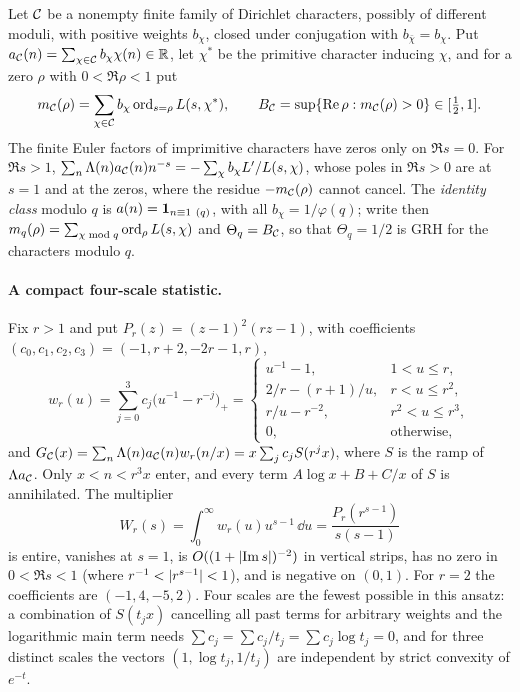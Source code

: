 Let $\mathcal{C}$ be a nonempty finite family of Dirichlet characters, possibly of different moduli,
with positive weights $b_\chi$, closed under conjugation with $b_{\bar\chi}=b_\chi$. Put
$a_{\mathcal{C}}(n)=\sum_{\chi\in\mathcal{C}}b_\chi\chi(n)\in\mathbb{R}$, let $\chi^*$ be the primitive character
inducing $\chi$, and for a zero $\rho$ with $0<\Re\rho<1$ put
\[
 m_{\mathcal{C}}(\rho)=\sum_{\chi\in\mathcal{C}}b_\chi\operatorname{ord}_{s=\rho}L(s,\chi^*),\qquad
 B_{\mathcal{C}}=\sup\{\operatorname{Re}\rho:m_{\mathcal{C}}(\rho)>0\}\in[\tfrac12,1].
\]
The finite Euler factors of imprimitive characters have zeros only on $\Re s=0$. For
$\Re s>1$, $\sum_n\Lambda(n)a_{\mathcal{C}}(n)n^{-s}=-\sum_\chi b_\chi L'/L(s,\chi)$, whose poles in
$\Re s>0$ are at $s=1$ and at the zeros, where the residue $-m_{\mathcal{C}}(\rho)$ cannot cancel. The
\emph{identity class} modulo $q$ is $a(n)=\mathbf{1}_{n\equiv1\ (q)}$, with all
$b_\chi=1/\varphi(q)$; write then $m_q(\rho)=\sum_{\chi\bmod q}\operatorname{ord}_\rho L(s,\chi)$ and
$\Theta_q=B_{\mathcal{C}}$, so that $\Theta_q=1/2$ is GRH for the characters modulo $q$.

\paragraph{A compact four-scale statistic.}
Fix $r>1$ and put $P_r(z)=(z-1)^2(rz-1)$, with coefficients $(c_0,c_1,c_2,c_3)=(-1,r+2,-2r-1,r)$,
\[
 w_r(u)=\sum_{j=0}^3c_j\bigl(u^{-1}-r^{-j}\bigr)_+=
 \begin{cases}u^{-1}-1,&1<u\le r,\\ 2/r-(r+1)/u,&r<u\le r^2,\\ r/u-r^{-2},&r^2<u\le r^3,\\
 0,&\text{otherwise},\end{cases}
\]
and $G_{\mathcal{C}}(x)=\sum_n\Lambda(n)a_{\mathcal{C}}(n)w_r(n/x)=x\sum_jc_jS(r^jx)$, where $S$ is the ramp
of $\Lambda a_{\mathcal{C}}$. Only $x<n<r^3x$ enter, and every term $A\log x+B+C/x$ of $S$ is
annihilated. The multiplier
\[
 W_r(s)=\int_0^\infty w_r(u)u^{s-1}\,\dd u=\frac{P_r(r^{s-1})}{s(s-1)}
\]
is entire, vanishes at $s=1$, is $O((1+\lvert\operatorname{Im} s\rvert)^{-2})$ in vertical strips, has no zero in
$0<\Re s<1$ (where $r^{-1}<\lvert r^{s-1}\rvert<1$), and is negative on $(0,1)$. For $r=2$ the
coefficients are $(-1,4,-5,2)$. Four scales are the fewest possible in this ansatz: a
combination of $S(t_jx)$ cancelling all past terms for arbitrary weights and the logarithmic
main term needs $\sum c_j=\sum c_j/t_j=\sum c_j\log t_j=0$, and for three distinct scales the
vectors $(1,\log t_j,1/t_j)$ are independent by strict convexity of $e^{-t}$.

